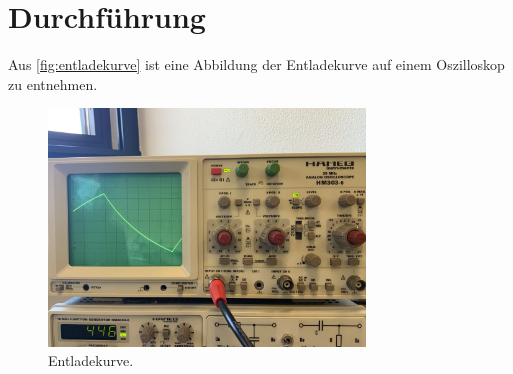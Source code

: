 \section{Durchführung}
\label{sec:Durchführung}

Aus \autoref{fig:entladekurve} ist eine Abbildung der Entladekurve auf einem Oszilloskop zu entnehmen.
\begin{figure}[H]
    \centering
    \includegraphics[width=0.75\textwidth]{Dateien/entladekurve.jpeg}
    \caption{Entladekurve.}
    \label{fig:entladekurve}
\end{figure}